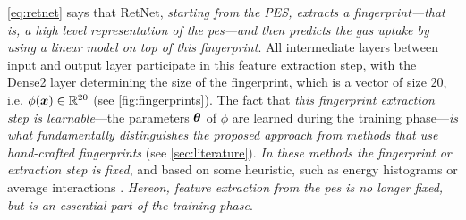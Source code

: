\Equation{} \ref{eq:retnet} says that RetNet, \emph{starting from the PES,
extracts a fingerprint---that is, a high level
representation of the \gls{pes}---and then
predicts the gas uptake by using a linear model on top of this fingerprint}. All
intermediate layers between input and output layer
participate in this feature extraction step, with the Dense\num{2} layer
determining the size of the fingerprint, which is a vector of size \num{20},
i.e. $\phi(\boldsymbol{x}) \in \mathbb{R}^{20}$ (see \Figure{} \ref{fig:fingerprints}). The
fact that \emph{this fingerprint extraction step
is learnable}---the parameters $\boldsymbol{\theta}$ of $\phi$ are learned during the training
phase---\emph{is what fundamentally distinguishes the
proposed approach from methods that use hand-crafted
fingerprints} (see \Section{}
\ref{sec:literature}). \emph{In these methods the fingerprint or
extraction step is fixed}, and based on some
heuristic, such as energy histograms \parencite{bucior} or average interactions
\parencite{generic}. \emph{Hereon, feature extraction from the \gls{pes} is no
longer fixed, but is an essential part of the training phase}.

